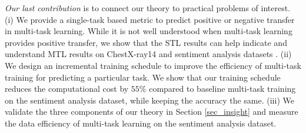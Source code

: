 \textit{Our last contribution} is to connect our theory to practical problems of interest.
(i) We provide a single-task based metric to predict positive or negative transfer in multi-task learning.
While it is not well understood when multi-task learning provides positive transfer, we show that the STL results can help indicate and understand MTL results on ChestX-ray14 \cite{chexnet17} and sentiment analysis datasets \cite{LZWDA18}.
(ii) We design an incremental training schedule to improve the efficiency of multi-task training for predicting a particular task.
We show that our training schedule reduces the computational cost by $55\%$ compared to baseline multi-task training on the sentiment analysis dataset, while keeping the accuracy the same.
(iii) We validate the three components of our theory in Section \ref{sec_insight} and measure the data efficiency of multi-task learning on the sentiment analysis dataset.

